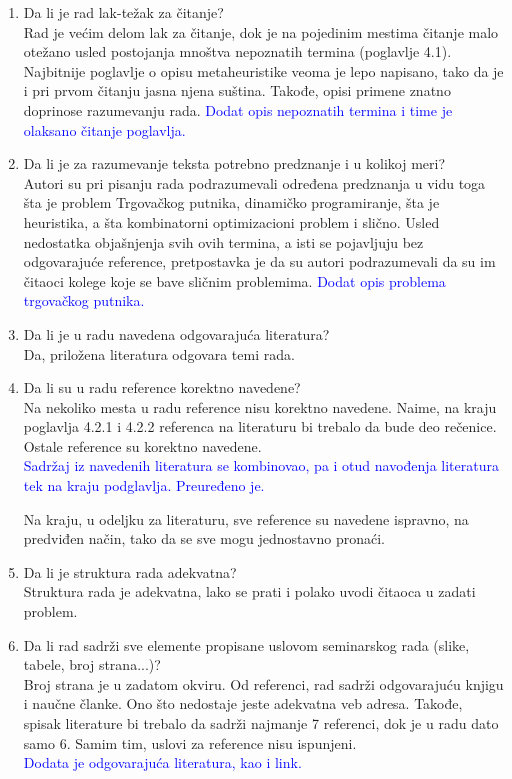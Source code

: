\documentclass[a4paper]{report}
\newcommand{\odgovor}[1]{\textcolor{blue}{#1}}
\begin{document}
\begin{enumerate}
\item Da li je rad lak-težak za čitanje?\\
Rad je većim delom lak za čitanje, dok je na pojedinim mestima čitanje malo otežano usled postojanja mnoštva nepoznatih termina (poglavlje 4.1). Najbitnije poglavlje o opisu metaheuristike veoma je lepo napisano, tako da je i pri prvom čitanju jasna njena suština. Takođe, opisi primene znatno doprinose razumevanju rada.
\odgovor{Dodat opis nepoznatih termina i time je olaksano čitanje poglavlja.\\}
\item Da li je za razumevanje teksta potrebno predznanje i u kolikoj meri?\\
Autori su pri pisanju rada podrazumevali određena predznanja u vidu toga šta je problem Trgovačkog putnika, dinamičko programiranje, šta je heuristika, a šta kombinatorni optimizacioni problem i slično. Usled nedostatka objašnjenja svih ovih termina, a isti se pojavljuju bez odgovarajuće reference, pretpostavka je da su autori podrazumevali da su im čitaoci kolege koje se bave sličnim problemima.
\odgovor{Dodat opis problema trgovačkog putnika.\\} 
\item Da li je u radu navedena odgovarajuća literatura?\\
Da, priložena literatura odgovara temi rada.

\item Da li su u radu reference korektno navedene?\\
Na nekoliko mesta u radu reference nisu korektno navedene. Naime, na kraju poglavlja 4.2.1 i 4.2.2 referenca na literaturu bi trebalo da bude deo rečenice. Ostale reference su korektno navedene.\\
\odgovor{Sadržaj iz navedenih literatura se kombinovao, pa i otud navođenja literatura tek na kraju podglavlja. Preuređeno je.\\} 

Na kraju, u odeljku za literaturu, sve reference su navedene ispravno, na predviđen način, tako da se sve mogu jednostavno pronaći.

\item Da li je struktura rada adekvatna?\\
Struktura rada je adekvatna, lako se prati i polako uvodi čitaoca u zadati problem.

\item Da li rad sadrži sve elemente propisane uslovom seminarskog rada (slike, tabele, broj strana...)?\\
Broj strana je u zadatom okviru. Od referenci, rad sadrži odgovarajuću knjigu i naučne članke. Ono što nedostaje jeste adekvatna veb adresa. Takođe, spisak literature bi trebalo da sadrži najmanje 7 referenci, dok je u radu dato samo 6. Samim tim, uslovi za reference nisu ispunjeni.\\
\odgovor{Dodata je odgovarajuća literatura, kao i link.}


\end{enumerate}
\end{document}

